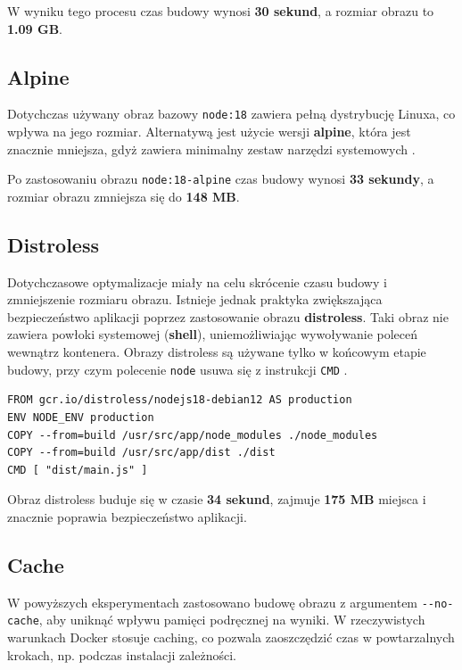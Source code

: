 \documentclass{article}
\begin{document}
W wyniku tego procesu czas budowy wynosi \textbf{30 sekund}, a rozmiar obrazu to \textbf{1.09 GB}.

\subsection{Alpine}

Dotychczas używany obraz bazowy \lstinline|node:18| zawiera pełną dystrybucję Linuxa, co wpływa na jego rozmiar. Alternatywą jest użycie wersji \textbf{alpine}, która jest znacznie mniejsza, gdyż zawiera minimalny zestaw narzędzi systemowych \cite{DockerAlpine}.

Po zastosowaniu obrazu \lstinline|node:18-alpine| czas budowy wynosi \textbf{33 sekundy}, a rozmiar obrazu zmniejsza się do \textbf{148 MB}.

\subsection{Distroless}

Dotychczasowe optymalizacje miały na celu skrócenie czasu budowy i zmniejszenie rozmiaru obrazu. Istnieje jednak praktyka zwiększająca bezpieczeństwo aplikacji poprzez zastosowanie obrazu \textbf{distroless}. Taki obraz nie zawiera powłoki systemowej (\textbf{shell}), uniemożliwiając wywoływanie poleceń wewnątrz kontenera. Obrazy distroless są używane tylko w końcowym etapie budowy, przy czym polecenie \lstinline|node| usuwa się z instrukcji \lstinline|CMD| \cite{MediumDistroless}.

\begin{lstlisting}[caption=Ostatni etap distroless Dockerfile]
FROM gcr.io/distroless/nodejs18-debian12 AS production
ENV NODE_ENV production
COPY --from=build /usr/src/app/node_modules ./node_modules
COPY --from=build /usr/src/app/dist ./dist
CMD [ "dist/main.js" ]
\end{lstlisting}

Obraz distroless buduje się w czasie \textbf{34 sekund}, zajmuje \textbf{175 MB} miejsca i znacznie poprawia bezpieczeństwo aplikacji.

\subsection{Cache}

W powyższych eksperymentach zastosowano budowę obrazu z argumentem \lstinline|--no-cache|, aby uniknąć wpływu pamięci podręcznej na wyniki. W rzeczywistych warunkach Docker stosuje caching, co pozwala zaoszczędzić czas w powtarzalnych krokach, np. podczas instalacji zależności.
\end{document}
